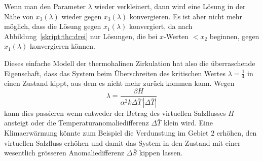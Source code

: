 Wenn man den Parameter $\lambda$ wieder verkleinert, dann wird
eine Lösung in der Nähe von $x_3(\lambda)$ wieder gegen
$x_3(\lambda)$ konvergieren.
Es ist aber nicht mehr möglich, dass die Lösung gegen $x_1(\lambda)$
konvergiert, da nach Abbildung~\ref{skript:thc:drei} nur Lösungen,
die bei $x$-Werten $<x_2$ beginnen, gegen $x_1(\lambda)$ konvergieren
können.

Dieses einfache Modell der thermohalinen Zirkulation hat also die
überraschende Eigenschaft, dass das System beim Überschreiten des
kritischen Wertes $\lambda=\frac14$ in einen Zustand kippt, aus dem
es nicht mehr zurück kommen kann.
Wegen
\[
\lambda
=
\frac{\beta H}{\alpha^2k\Delta\bar T\,|\Delta\bar T|}
\]
kann dies passieren wenn entweder der Betrag des virtuellen Salzflusses 
$H$ ansteigt oder die Temperaturanomaliedifferenz $\Delta\bar T$
klein wird.
Eine Klimaerwärmung könnte zum Beispiel die Verdunstung im Gebiet $2$
erhöhen, den virtuellen Salzfluss erhöhen und damit das System
in den Zustand mit einer wesentlich grösseren Anomaliedifferenz
$\Delta\bar S$ kippen lassen.





